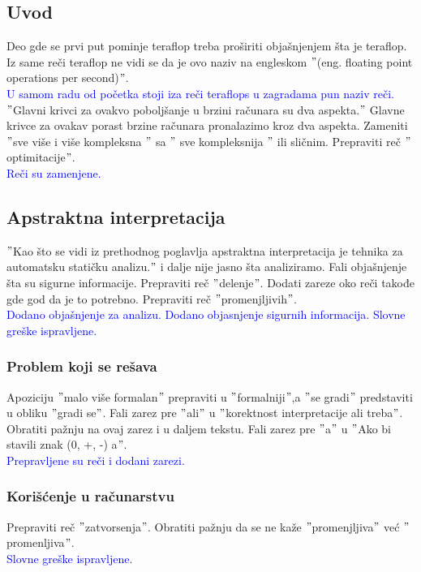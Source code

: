 \documentclass[a4paper]{report}
\newcommand{\odgovor}[1]{\textcolor{blue}{#1}}
\begin{document}
\subsection{Uvod}
Deo gde se prvi put pominje teraflop treba proširiti objašnjenjem šta je teraflop. Iz same reči teraflop ne vidi se da je ovo naziv na engleskom $"$(eng. floating point operations per second)$"$.\\
\odgovor{U samom radu od početka stoji iza reči teraflops u zagradama pun naziv reči.}
\\
$"$Glavni krivci za ovakvo poboljšanje u brzini računara su dva aspekta.$"$
Glavne krivce za ovakav porast brzine računara pronalazimo kroz dva aspekta. Zameniti $"$sve više i više kompleksna $"$ sa $"$ sve kompleksnija $"$ ili sličnim. Prepraviti reč $"$optimitacije$"$. \\
\odgovor{Reči su zamenjene.}

\subsection{Apstraktna interpretacija}
$"$Kao što se vidi iz prethodnog poglavlja apstraktna interpretacija je
tehnika za automatsku statičku analizu.$"$ i dalje nije jasno šta analiziramo. Fali objašnjenje šta su sigurne informacije. Prepraviti reč $"$delenje$"$. Dodati zareze oko reči takođe gde god da je to potrebno. Prepraviti reč $"$promenjljivih$"$. \\
\odgovor{Dodano objašnjenje za analizu. Dodano objasnjenje sigurnih informacija. Slovne greške ispravljene.}

\subsubsection{Problem koji se rešava}
Apoziciju $"$malo više formalan$"$ prepraviti u $"$formalniji$"$,a $"$se gradi$"$ predstaviti u obliku $"$gradi se$"$. Fali zarez pre $"$ali$"$ u $"$korektnost interpretacije ali treba$"$. Obratiti pažnju na ovaj zarez i u daljem tekstu. Fali zarez pre $"$a$"$ u $"$Ako bi stavili znak (0, +, -) a$"$. \\
\odgovor{Prepravljene su reči i dodani zarezi.}

\subsubsection{Korišćenje u računarstvu}
Prepraviti reč $"$zatvorsenja$"$. Obratiti pažnju da se ne kaže $"$promenjljiva$"$ već $"$promenljiva$"$. \\
\odgovor{Slovne greške ispravljene.}
\end{document}
